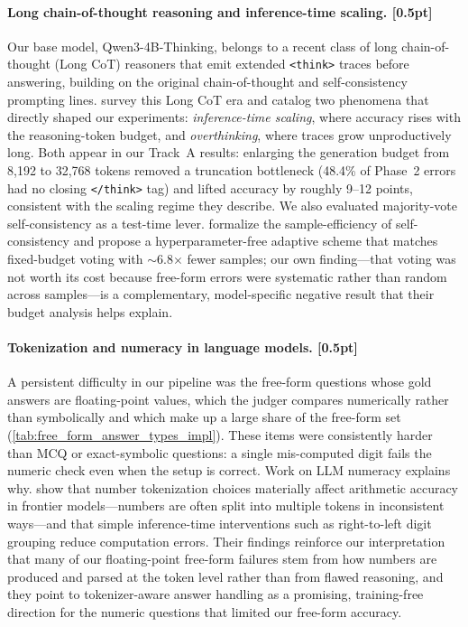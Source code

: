 \documentclass{article}
\begin{document}
\paragraph{Long chain-of-thought reasoning and inference-time scaling. [0.5pt]}
Our base model, Qwen3-4B-Thinking, belongs to a recent class of long chain-of-thought (Long CoT)
reasoners that emit extended \texttt{<think>} traces before answering, building on the original
chain-of-thought \citep{wei2022chain} and self-consistency \citep{wang2022selfconsistency} prompting
lines. \citet{chen2026longcot} survey this Long CoT era and catalog two phenomena that directly shaped
our experiments: \emph{inference-time scaling}, where accuracy rises with the reasoning-token budget,
and \emph{overthinking}, where traces grow unproductively long. Both appear in our Track~A results:
enlarging the generation budget from 8{,}192 to 32{,}768 tokens removed a truncation bottleneck (48.4\%
of Phase~2 errors had no closing \texttt{</think>} tag) and lifted accuracy by roughly 9--12 points,
consistent with the scaling regime they describe. We also evaluated majority-vote self-consistency as a
test-time lever. \citet{feng2026multipath} formalize the sample-efficiency of self-consistency and
propose a hyperparameter-free adaptive scheme that matches fixed-budget voting with $\sim$6.8$\times$
fewer samples; our own finding---that voting was not worth its cost because free-form errors were
systematic rather than random across samples---is a complementary, model-specific negative result that
their budget analysis helps explain.

\paragraph{Tokenization and numeracy in language models. [0.5pt]}
A persistent difficulty in our pipeline was the free-form questions whose gold answers are
floating-point values, which the judger compares numerically rather than symbolically and which make up
a large share of the free-form set (\cref{tab:free_form_answer_types_impl}). These items were
consistently harder than MCQ or exact-symbolic questions: a single mis-computed digit fails the numeric
check even when the setup is correct. Work on LLM numeracy explains why. \citet{singh2024tokenization}
show that number tokenization choices materially affect arithmetic accuracy in frontier models---numbers
are often split into multiple tokens in inconsistent ways---and that simple inference-time interventions
such as right-to-left digit grouping reduce computation errors. Their findings reinforce our
interpretation that many of our floating-point free-form failures stem from how numbers are produced and
parsed at the token level rather than from flawed reasoning, and they point to tokenizer-aware answer
handling as a promising, training-free direction for the numeric questions that limited our free-form
accuracy.
%
\end{document}
